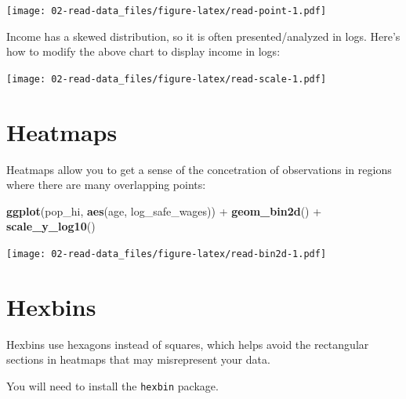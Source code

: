 \documentclass[]{book}
\newenvironment{Shaded}{\begin{snugshade}}{\end{snugshade}}
\newcommand{\KeywordTok}[1]{\textcolor[rgb]{0.13,0.29,0.53}{\textbf{{#1}}}}
\newcommand{\DataTypeTok}[1]{\textcolor[rgb]{0.13,0.29,0.53}{{#1}}}
\newcommand{\DecValTok}[1]{\textcolor[rgb]{0.00,0.00,0.81}{{#1}}}
\newcommand{\StringTok}[1]{\textcolor[rgb]{0.31,0.60,0.02}{{#1}}}
\newcommand{\NormalTok}[1]{{#1}}
\theoremstyle{definition}
\theoremstyle{definition}
\theoremstyle{remark}
\begin{document}
\texttt{[image: 02-read-data\_files/figure-latex/read-point-1.pdf]}

Income has a skewed distribution, so it is often presented/analyzed in
logs. Here's how to modify the above chart to display income in logs:

\begin{Shaded}
\end{Shaded}

\texttt{[image: 02-read-data\_files/figure-latex/read-scale-1.pdf]}

\section{Heatmaps}\label{heatmaps}

Heatmaps allow you to get a sense of the concetration of observations in
regions where there are many overlapping points:

\begin{Shaded}
\begin{Highlighting}[]
\KeywordTok{ggplot}\NormalTok{(pop_hi, }\KeywordTok{aes}\NormalTok{(age, log_safe_wages)) +}
\StringTok{  }\KeywordTok{geom_bin2d}\NormalTok{() +}
\StringTok{  }\KeywordTok{scale_y_log10}\NormalTok{()}
\end{Highlighting}
\end{Shaded}

\texttt{[image: 02-read-data\_files/figure-latex/read-bin2d-1.pdf]}

\section{Hexbins}\label{hexbins}

Hexbins use hexagons instead of squares, which helps avoid the
rectangular sections in heatmaps that may misrepresent your data.

You will need to install the \texttt{hexbin} package.
\end{document}
